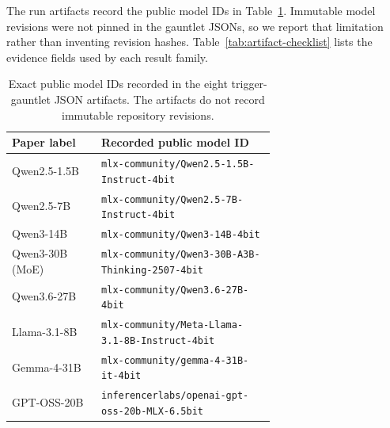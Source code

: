 \documentclass{article}
\begin{document}
The run artifacts record the public model IDs in Table~\ref{tab:model-ids}. Immutable model revisions were not pinned in the gauntlet JSONs, so we report that limitation rather than inventing revision hashes. Table~\ref{tab:artifact-checklist} lists the evidence fields used by each result family.

\begin{table}[h]
\begin{center}
\scriptsize
\begin{tabular}{@{}lp{0.66\linewidth}@{}}
\toprule
\textbf{Paper label} & \textbf{Recorded public model ID} \\
\midrule
Qwen2.5-1.5B & \texttt{mlx-community/Qwen2.5-1.5B-Instruct-4bit} \\
Qwen2.5-7B & \texttt{mlx-community/Qwen2.5-7B-Instruct-4bit} \\
Qwen3-14B & \texttt{mlx-community/Qwen3-14B-4bit} \\
Qwen3-30B (MoE) & \texttt{mlx-community/Qwen3-30B-A3B-Thinking-2507-4bit} \\
Qwen3.6-27B & \texttt{mlx-community/Qwen3.6-27B-4bit} \\
Llama-3.1-8B & \texttt{mlx-community/Meta-Llama-3.1-8B-Instruct-4bit} \\
Gemma-4-31B & \texttt{mlx-community/gemma-4-31B-it-4bit} \\
GPT-OSS-20B & \texttt{inferencerlabs/openai-gpt-oss-20b-MLX-6.5bit} \\
\bottomrule
\end{tabular}
\end{center}
\caption{Exact public model IDs recorded in the eight trigger-gauntlet JSON artifacts. The artifacts do not record immutable repository revisions.}
\label{tab:model-ids}
\end{table}
\end{document}
